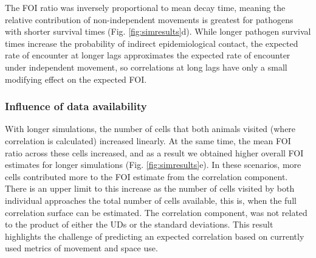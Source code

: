 \documentclass[letterpaper]{article}
\begin{document}
The FOI ratio was inversely proportional to mean decay time, meaning the relative contribution of non-independent movements is greatest for pathogens with shorter survival times (Fig. \ref{fig:simresults}d). While longer pathogen survival times increase the probability of indirect epidemiological contact, the expected rate of encounter at longer lags approximates the expected rate of encounter under independent movement, so correlations at long lags have only a small modifying effect on the expected FOI. %


\subsubsection*{Influence of data availability}

With longer simulations, the number of cells that both animals visited (where correlation is calculated) increased linearly. At the same time, the mean FOI ratio across these cells increased,  and as a result we obtained higher overall FOI estimates for longer simulations (Fig. \ref{fig:simresults}e). In these scenarios, more cells contributed more to the FOI estimate from the correlation component. There is an upper limit to this increase as the number of cells visited by both individual approaches the total number of cells available, this is, when the full correlation surface can be estimated.  %
The correlation component, was not related to the product of either the UDs or the standard deviations. This result highlights the challenge of predicting an expected correlation based on currently used metrics of movement and space use.

\end{document}
